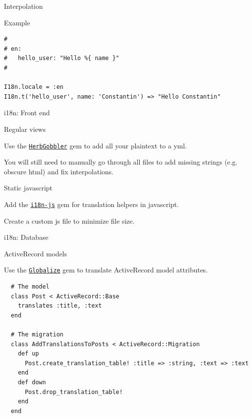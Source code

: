 \documentclass{beamer}
\begin{document}
\begin{frame}[fragile]{Interpolation}

\begin{block}{Example}
\begin{lstlisting}
#
# en:
#   hello_user: "Hello %{ name }"
#

I18n.locale = :en
I18n.t('hello_user', name: 'Constantin') => "Hello Constantin"
\end{lstlisting}
\end{block}
\end{frame}

\begin{frame}[fragile]{i18n: Front end}
\begin{block}{Regular views}

Use the \href{https://github.com/douglasjsellers/herbgobbler}{\lstinline{HerbGobbler}} gem to add all your plaintext to a yml.

You will still need to manually go through all files to add missing strings (e.g. obscure html) and fix interpolations.

\end{block}

\begin{block}{Static javascript}

Add the \href{https://github.com/fnando/i18n-js}{\lstinline{i18n-js}} gem for translation helpers in javascript.

Create a custom js file to minimize file size.

\end{block}
\end{frame}


\begin{frame}[fragile]{i18n: Database}
\begin{block}{ActiveRecord models}

Use the \href{https://github.com/globalize/globalize}{\lstinline{Globalize}} gem to translate ActiveRecord model attributes.

\begin{lstlisting}
  # The model
  class Post < ActiveRecord::Base
    translates :title, :text
  end

  # The migration
  class AddTranslationsToPosts < ActiveRecord::Migration
    def up
      Post.create_translation_table! :title => :string, :text => :text
    end
    def down
      Post.drop_translation_table!
    end
  end
\end{lstlisting}

\end{block}
\end{frame}
\end{document}
